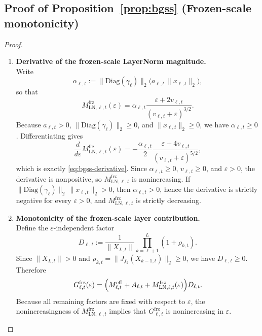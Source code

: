 \documentclass[twoside]{article}
\theoremstyle{definition}
\theoremstyle{remark}
\begin{document}
\subsection{Proof of Proposition~\ref{prop:bgss} (Frozen-scale monotonicity)}
\label{app:bgss-proof}

\begin{proof}
\phantom{.}
\begin{enumerate}
  \item \textbf{Derivative of the frozen-scale LayerNorm magnitude.}\\
  Write
  \[
  \alpha_{\ell,t}
  :=
  \|\mathrm{Diag}(\gamma_\ell)\|_2
  \bigl(a_{\ell,t}\,\|x_{\ell,t}\|_2\bigr),
  \]
  so that
  \[
  M_{\mathrm{LN},\ell,t}^{\mathrm{frz}}(\varepsilon)
  =
  \alpha_{\ell,t}
  \frac{\varepsilon+2v_{\ell,t}}{(v_{\ell,t}+\varepsilon)^{3/2}}.
  \]
  Because $a_{\ell,t}>0$, $\|\mathrm{Diag}(\gamma_\ell)\|_2\ge 0$, and
  $\|x_{\ell,t}\|_2\ge 0$, we have
  $\alpha_{\ell,t}\ge 0$. Differentiating gives
  \[
  \frac{d}{d\varepsilon}M_{\mathrm{LN},\ell,t}^{\mathrm{frz}}(\varepsilon)
  =
  -\frac{\alpha_{\ell,t}}{2}
  \frac{\varepsilon+4v_{\ell,t}}{(v_{\ell,t}+\varepsilon)^{5/2}},
  \]
  which is exactly \eqref{eq:bgss-derivative}. Since $\alpha_{\ell,t}\ge 0$,
  $v_{\ell,t}\ge 0$, and $\varepsilon>0$, the derivative is nonpositive, so
  $M_{\mathrm{LN},\ell,t}^{\mathrm{frz}}$ is nonincreasing. If
  $\|\mathrm{Diag}(\gamma_\ell)\|_2\,\|x_{\ell,t}\|_2>0$, then $\alpha_{\ell,t}>0$, hence the
  derivative is strictly negative for every $\varepsilon>0$, and
  $M_{\mathrm{LN},\ell,t}^{\mathrm{frz}}$ is strictly decreasing.

  \item \textbf{Monotonicity of the frozen-scale layer contribution.}\\
  Define the $\varepsilon$-independent factor
  \[
  D_{\ell,t}
  :=
  \frac{1}{\|X_{L,t}\|}
  \prod_{k=\ell+1}^{L}(1+\rho_{k,t}).
  \]
  Since $\|X_{L,t}\|>0$ and $\rho_{k,t}=\|J_{f_k}(X_{k-1,t})\|_2\ge 0$, we have
  $D_{\ell,t}\ge 0$. Therefore
  \[
  G_{\ell,t}^{\mathrm{frz}}(\varepsilon)
  =
  \Bigl(
  M^{\mathrm{eff}}_{\ell,t}
  +
  A_{\ell,t}
  +
  M_{\mathrm{LN},\ell,t}^{\mathrm{frz}}(\varepsilon)
  \Bigr)D_{\ell,t}.
  \]
  Because all remaining factors are fixed with respect to
  $\varepsilon$, the
  nonincreasingness of $M_{\mathrm{LN},\ell,t}^{\mathrm{frz}}$ implies that
  $G_{\ell,t}^{\mathrm{frz}}$ is nonincreasing in $\varepsilon$.


\end{enumerate}
\end{proof}
\end{document}
